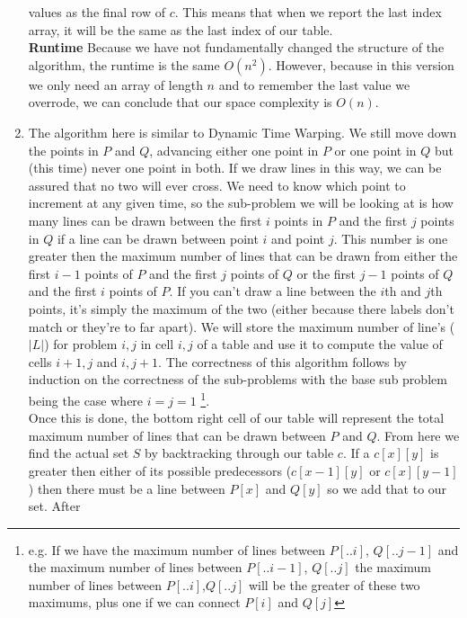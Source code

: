 \documentclass[11pt]{article}
\begin{document}
\begin{enumerate}
			values as the final row of $c$. This means that when we report
			the last index array, it will be the same as the last
			index of our table.\\
			\textbf{Runtime}
			Because we have not fundamentally changed the structure
			of the algorithm, the runtime is the same $O(n^2)$. However,
			because in this version we only need an array of length
			$n$ and to remember the last value we overrode, we can
			conclude that our space complexity is $O(n)$.
		\item
			The algorithm here is similar to Dynamic Time Warping.
			We still move down the points in $P$ and $Q$,
			advancing either one point in $P$ or one point in $Q$
			but (this time) never one point in both. If we draw
			lines in this way, we can be assured that no two will
			ever cross. We need to know which point to increment at
			any given time, so the sub-problem we will be looking at
			is how many lines can be drawn between the first $i$
			points in $P$ and the first $j$ points in $Q$ if a line
			can be drawn between point $i$ and point $j$. This number
			is one greater then the maximum number of lines that can
			be drawn from either the first $i-1$ points of $P$ and
			the first $j$ points of $Q$ or the first $j-1$ points of
			$Q$ and the first $i$ points of $P$. If you can't draw a
			line between the $i$th and $j$th points, it's simply the
			maximum of the two (either because there labels don't
			match or they're to far apart). We will store the
			maximum number of line's ($|L|$) for 
			problem $i, j$ in cell $i,j$ of a table and use it to
			compute the value of cells $i+1,j$ and $i,j+1$.
			The correctness of this algorithm follows by induction on
			the correctness of the sub-problems with the base sub
			problem being the case where $i = j = 1$ \footnote{e.g. If we
			have the maximum number of lines between $P[..i]$, 
			$Q[..j-1]$ and the maximum number of lines between
			$P[..i-1]$, $Q[..j]$ the maximum number of lines between
			$P[..i]$,$Q[..j]$ will be the greater of these two
			maximums, plus one if we can connect $P[i]$ and
			$Q[j]$}.\\ 
			Once this is done, the bottom right cell of our
			table will represent the total maximum number of lines
			that can be drawn between $P$ and $Q$. From here we find
			the actual set $S$ by backtracking through our table $c$. If
			a $c[x][y]$ is greater then either of its possible
			predecessors ($c[x-1][y]$ or $c[x][y-1]$) then there
			must be a line between $P[x]$ and $Q[y]$ so we add that
			to our set. After

\end{enumerate}
\end{document}
